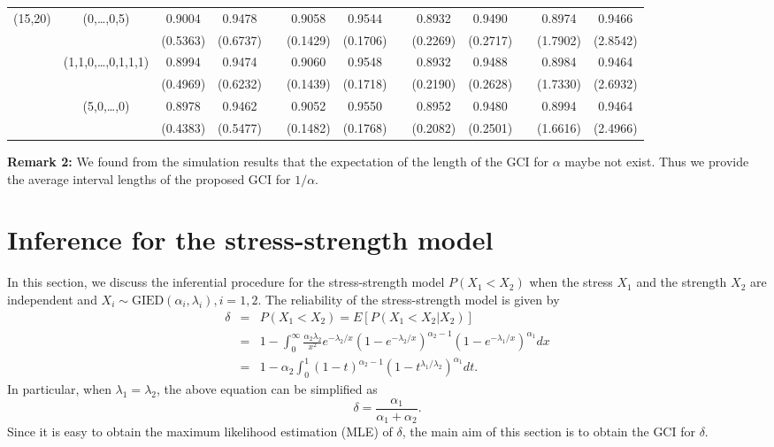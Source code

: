 \documentclass[12pt]{article}
\begin{document}
{\begin{center}
\begin{tabular}{ccccccccccccc}
(15,20) & (0,\dots,0,5)       &0.9004  &  0.9478 &&0.9058  & 0.9544 &&0.8932  & 0.9490 &&0.8974  & 0.9466 \\
        &                     &(0.5363)& (0.6737)&&(0.1429)&(0.1706)&&(0.2269)&(0.2717)&&(1.7902)&(2.8542)\\
        &(1,1,0,\dots,0,1,1,1)&0.8994  &  0.9474 &&0.9060  & 0.9548 &&0.8932  & 0.9488 &&0.8984  & 0.9464\\
        &                     &(0.4969)& (0.6232)&&(0.1439)&(0.1718)&&(0.2190)&(0.2628)&&(1.7330)&(2.6932)\\
        & (5,0,\dots,0)       &0.8978  &  0.9462 &&0.9052  & 0.9550 &&0.8952  & 0.9480 &&0.8994  & 0.9464\\
        &                     &(0.4383)& (0.5477)&&(0.1482)&(0.1768)&&(0.2082)&(0.2501)&&(1.6616)&(2.4966)\\\hline
\end{tabular}
\end{center}}

{\bf Remark 2:} We found from the simulation results that the expectation of the length of the GCI for $\alpha$ maybe not exist. Thus we provide the average interval lengths of the proposed GCI for $1/\alpha$.

\section{Inference for the stress-strength model}
In this section, we discuss the inferential procedure for the stress-strength model $P(X_1<X_2)$ when the stress $X_1$ and the strength $X_2$ are independent and $X_i\sim{\mbox{GIED}(\alpha_i,\lambda_i)}, i=1,2$. The reliability of the stress-strength model is given by
\begin{eqnarray}
\delta&=&P(X_1<X_2)=E[P(X_1<X_2|X_2)]\nonumber\\
&=&1-\int_0^\infty\frac{\alpha_2\lambda_2}{x^2}e^{-\lambda_2/x}(1-e^{-\lambda_2/x})^{\alpha_2-1}(1-e^{-\lambda_1/x})^{\alpha_1}dx \nonumber\\
&=&1-\alpha_2 \int_0^1(1-t)^{\alpha_2-1}(1-t^{\lambda_1/\lambda_2})^{\alpha_1}dt. \label{eq25}
\end{eqnarray}
In particular, when $\lambda_1=\lambda_2$, the above equation can be simplified as
\begin{equation*}%
\delta=\frac{\alpha_1}{\alpha_1+\alpha_2}.
\end{equation*}
Since it is easy to obtain the maximum likelihood estimation (MLE) of $\delta$, the main aim of this section is to obtain the GCI for $\delta$.
\end{document}
